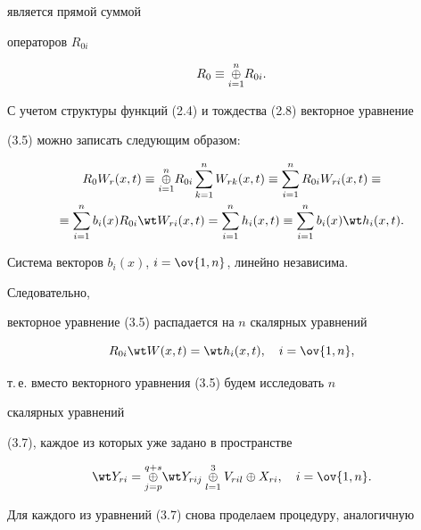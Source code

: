 является прямой суммой 


операторов $R_{0i}$ 


$$ 


R_0\equiv\updown{n}{i=1}{\oplus}R_{0i}. 


$$ 


 


С учетом структуры функций (2.4) и тождества (2.8) векторное уравнение 


(3.5) можно записать следующим образом: 


\begin{multline*} 


R_0W_r(x,t)\equiv\updown{n}{i=1}{\oplus}R_{0i} 


\sum^n_{k=1}W_{rk}(x,t)\equiv\sum^n_{i=1}R_{0i}W_{ri}(x,t)\equiv \\ 


\equiv\sum^n_{i=1}b_i(x)R_{0i}\wt W_{ri}(x,t)=


\sum^n_{i=1}h_i(x,t)\equiv\sum^n_{i=1} 


b_i(x)\wt h_i(x,t). 


\end{multline*} 


 


Система векторов $b_i(x)$, $i=\ov{1,n}$, линейно независима. 


Следовательно, 


векторное уравнение (3.5) распадается на $n$ скалярных уравнений 


\begin{equation} 


R_{0i}\wt W(x,t)=\wt h_i(x,t),\quad i=\ov{1,n},


\end{equation} 


т.\,е. вместо векторного уравнения (3.5) будем исследовать $n$ 


скалярных уравнений 


(3.7), каждое из которых уже задано в пространстве 


$$ 


\wt Y_{ri}=\updown{q+s}{j=p}{\oplus}\wt Y_{rij} 


\updown{3}{l=1}{\oplus}V_{ril}\oplus X_{ri},\quad 


i=\ov{1,n}. 


$$ 


 


Для каждого из уравнений (3.7) снова проделаем процедуру, аналогичную 


